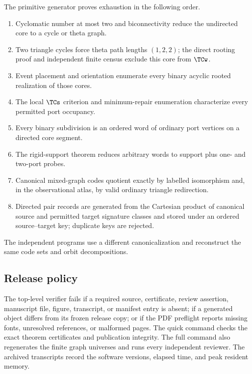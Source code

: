 The primitive generator proves exhaustion in the following order.
\begin{enumerate}[label=\textup{(\roman*)}]
\item Cyclomatic number at most two and biconnectivity reduce the undirected core to a cycle or theta graph.
\item Two triangle cycles force theta path lengths $(1,2,2)$; the direct rooting proof and independent finite census exclude this core from $\TCw$.
\item Event placement and orientation enumerate every binary acyclic rooted realization of those cores.
\item The local $\TCs$ criterion and minimum-repair enumeration characterize every permitted port occupancy.
\item Every binary subdivision is an ordered word of ordinary port vertices on a directed core segment.
\item The rigid-support theorem reduces arbitrary words to support plus one- and two-port probes.
\item Canonical mixed-graph codes quotient exactly by labelled isomorphism and, in the observational atlas, by valid ordinary triangle redirection.
\item Directed pair records are generated from the Cartesian product of canonical source and permitted target signature classes and stored under an ordered source--target key; duplicate keys are rejected.
\end{enumerate}
The independent programs use a different canonicalization and reconstruct the same code sets and orbit decompositions.

\subsection{Release policy}

The top-level verifier fails if a required source, certificate, review assertion, manuscript file, figure, transcript, or manifest entry is absent; if a generated object differs from its frozen release copy; or if the PDF preflight reports missing fonts, unresolved references, or malformed pages.  The quick command checks the exact theorem certificates and publication integrity.  The full command also regenerates the finite graph universes and runs every independent reviewer.  The archived transcripts record the software versions, elapsed time, and peak resident memory.
